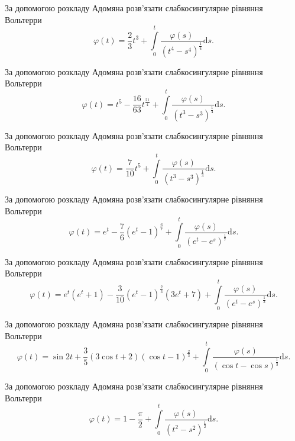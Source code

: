 \documentclass[12pt]{extarticle}
\begin{document}
\begin{Exercise}
За допомогою розкладу Адомяна розв’язати слабкосингулярне рівняння Вольтерри \[\varphi(t) = \dfrac{2}{3} t^3 + \int\limits_{0}^{t} \dfrac{\varphi(s)}{(t^4 - s^4)^\frac{1}{4}} \mathrm{d}s.\]
\end{Exercise}

\begin{Exercise}
За допомогою розкладу Адомяна розв’язати слабкосингулярне рівняння Вольтерри \[\varphi(t) = t^5 - \dfrac{16}{63}t^{\frac{21}{4}} + \int\limits_{0}^{t} \dfrac{\varphi(s)}{(t^3 - s^3)^\frac{1}{4}} \mathrm{d}s.\]
\end{Exercise}

\begin{Exercise}
За допомогою розкладу Адомяна розв’язати слабкосингулярне рівняння Вольтерри \[\varphi(t) = \dfrac{7}{10}t^5 + \int\limits_{0}^{t} \dfrac{\varphi(s)}{(t^3 - s^3)^\frac{1}{3}} \mathrm{d}s.\]
\end{Exercise}

\begin{Exercise}
За допомогою розкладу Адомяна розв’язати слабкосингулярне рівняння Вольтерри \[\varphi(t) = e^t - \dfrac{7}{6}\left(e^t - 1\right)^\frac{6}{7} + \int\limits_{0}^{t} \dfrac{\varphi(s)}{\left(e^t - e^s\right)^\frac{1}{7}} \mathrm{d}s.\]
\end{Exercise}

\begin{Exercise}
За допомогою розкладу Адомяна розв’язати слабкосингулярне рівняння Вольтерри \[\varphi(t) = e^t (e^t+1) - \dfrac{3}{10}\left(e^t - 1\right)^\frac{2}{3}(3e^t+7) + \int\limits_{0}^{t} \dfrac{\varphi(s)}{\left(e^t - e^s\right)^\frac{1}{3}} \mathrm{d}s.\]
\end{Exercise}

\begin{Exercise}
За допомогою розкладу Адомяна розв’язати слабкосингулярне рівняння Вольтерри \[\varphi(t) = \sin 2t + \dfrac{3}{5}\left(3 \cos t + 2\right)(\cos t - 1)^\frac{2}{3} + \int\limits_{0}^{t} \dfrac{\varphi(s)}{\left(\cos t - \cos s\right)^\frac{1}{3}} \mathrm{d}s.\]
\end{Exercise}

\begin{Exercise}
За допомогою розкладу Адомяна розв’язати слабкосингулярне рівняння Вольтерри \[\varphi(t) = 1 - \dfrac{\pi}{2} + \int\limits_{0}^{t} \dfrac{\varphi(s)}{\left(t^2 - s^2\right)^\frac{1}{2}} \mathrm{d}s.\]
\end{Exercise}
\end{document}
